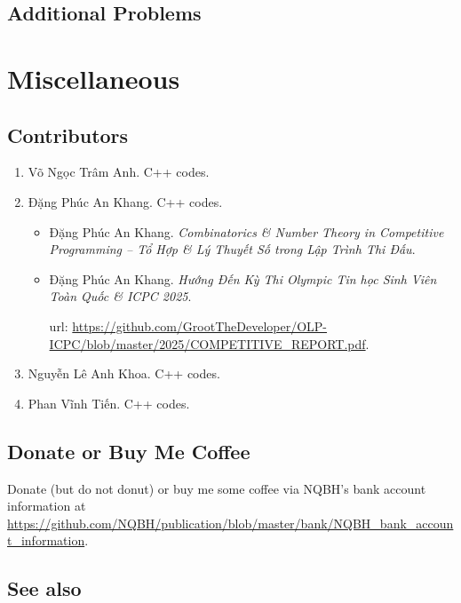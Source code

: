 \documentclass{article}
\begin{document}

\subsection{Additional Problems}


\section{Miscellaneous}

\subsection{Contributors}

\begin{enumerate}
	\item {\sc Võ Ngọc Trâm Anh}. C++ codes.
	\item {\sc Đặng Phúc An Khang}. C++ codes.
	\begin{itemize}
		\item {\sc Đặng Phúc An Khang}. {\it Combinatorics \& Number Theory in Competitive Programming -- Tổ Hợp \& Lý Thuyết Số trong Lập Trình Thi Đấu}.
		\item {\sc Đặng Phúc An Khang}. {\it Hướng Đến Kỳ Thi Olympic Tin học Sinh Viên Toàn Quốc \& ICPC 2025}.
		
		{\sc url}: \url{https://github.com/GrootTheDeveloper/OLP-ICPC/blob/master/2025/COMPETITIVE_REPORT.pdf}.
	\end{itemize}
	\item {\sc Nguyễn Lê Anh Khoa}. C++ codes.
	\item {\sc Phan Vĩnh Tiến}. C++ codes.
\end{enumerate}

\subsection{Donate or Buy Me Coffee}
Donate (but do not donut) or buy me some coffee via NQBH's bank account information at \url{https://github.com/NQBH/publication/blob/master/bank/NQBH_bank_account_information}.

\subsection{See also}
\end{document}
